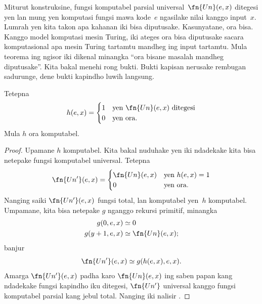 \documentclass[../../../include/open-logic-section]{subfiles}
\begin{document}

Miturut konstruksine, fungsi komputabel parsial
universal~$\fn{Un}(e,x)$ ditegesi yen lan mung yen
komputasi fungsi mawa kode~$e$ ngasilake nilai
kanggo input~$x$. Lumrah yen kita takon apa
kahanan iki bisa diputusake. Kasunyatane, ora bisa.
Kanggo model komputasi mesin Turing, iki ateges
ora bisa diputusake sacara komputasional apa mesin
Turing tartamtu mandheg ing input tartamtu.
Mula teorema ing ngisor iki dikenal minangka
``ora bisane masalah mandheg diputusake''.
Kita bakal menehi rong bukti. Bukti kapisan
nerusake rembugan sadurunge, dene bukti
kapindho luwih langsung.

\begin{thm}
Tetepna
\[
h(e, x)  =
\begin{cases}
1 & \text{yen\/ $\fn{Un}(e, x)$ ditegesi} \\
0 & \text{yen ora.}
\end{cases}
\]
Mula $h$ ora komputabel.
\end{thm}

\begin{proof}
Upamane $h$ komputabel. Kita bakal nuduhake
yen iki ndadekake kita bisa netepake fungsi
komputabel universal. Tetepna
\[
\fn{Un'}(e,x) =
\begin{cases}
\fn{Un}(e,x) & \text{yen $h(e,x) = 1$} \\
0 & \text{yen ora.}
\end{cases}
\]
Nanging saiki $\fn{Un'}(e, x)$ fungsi total,
lan komputabel yen~$h$ komputabel. Umpamane,
kita bisa netepake $g$ nganggo rekursi primitif,
minangka
\begin{align*}
g(0, e, x) & \simeq 0 \\
g(y+1, e, x) & \simeq \fn{Un}(e,x);
\end{align*}
banjur
\[
\fn{Un'}(e,x) \simeq g(h(e,x),e,x).
\]
Amarga $\fn{Un'}(e,x)$ padha karo $\fn{Un}(e,x)$
ing saben papan kang ndadekake fungsi kapindho
iku ditegesi, $\fn{Un'}$ universal kanggo
fungsi komputabel parsial kang jebul total.
Nanging iki nalisir .
\end{proof}
\end{document}
